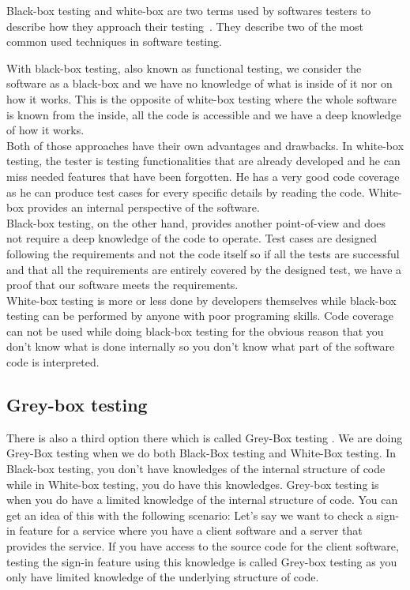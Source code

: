 \documentclass[12pt]{article}
\theoremstyle{definition}
\theoremstyle{definition}
\theoremstyle{remark}
\begin{document}

Black-box testing and white-box are two terms used by softwares testers to describe how they approach their testing~\cite{Patton:2005}. They describe two of the most common used techniques in software testing.

With black-box testing, also known as functional testing, we consider the software as a black-box and we have no knowledge of what is inside of it nor on how it works. This is the opposite of white-box testing where the whole software is known from the inside, all the code is accessible and we have a deep knowledge of how it works.\\

Both of those approaches have their own advantages and drawbacks. In white-box testing, the tester is testing functionalities that are already developed and he can miss needed features that have been forgotten. He has a very good code coverage as he can produce test cases for every specific details by reading the code. White-box provides an internal perspective of the software.\\

Black-box testing, on the other hand, provides another point-of-view and does not require a deep knowledge of the code to operate. Test cases are designed following the requirements and not the code itself so if all the tests are successful and that all the requirements are entirely covered by the designed test, we have a proof that our software meets the requirements.\\

White-box testing is more or less done by developers themselves while black-box testing can be performed by anyone with poor programing skills. Code coverage can not be used while doing black-box testing for the obvious reason that you don't know what is done internally so you don't know what part of the software code is interpreted.


\subsection{Grey-box testing}

There is also a third option there which is called \guillemotleft Grey-Box testing \guillemotright . We are doing Grey-Box testing when we do both Black-Box testing and White-Box testing. In Black-box testing, you don't have knowledges of the internal structure of code while in White-box testing, you do have this knowledges. Grey-box testing is when you do have a limited knowledge of the internal structure of code. You can get an idea of this with the following scenario: Let's say we want to check a sign-in feature for a service where you have a client software and a server that provides the service. If you have access to the source code for the client software, testing the sign-in feature using this knowledge is called Grey-box testing as you only have limited knowledge of the underlying structure of code.
\end{document}
